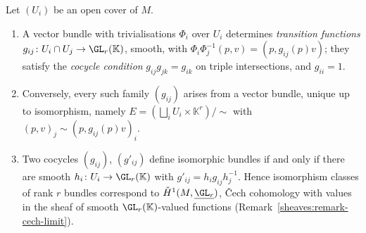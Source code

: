 \begin{proposition}\label{vector-bundles:proposition-cocycles}
Let $(U_i)$ be an open cover of $M$.
\begin{enumerate}
\item A vector bundle with trivialisations $\Phi_i$ over $U_i$ determines \emph{transition functions} $g_{ij} \colon U_i \cap U_j \to \GL_r(\mathbb{K})$, smooth, with
$\Phi_i\Phi_j^{-1}(p, v) = (p, g_{ij}(p)v)$; they satisfy the \emph{cocycle condition} $g_{ij}g_{jk} = g_{ik}$ on triple intersections, and $g_{ii} = 1$.
\item Conversely, every such family $(g_{ij})$ arises from a vector bundle, unique up to isomorphism, namely $E = (\bigsqcup_i U_i \times \mathbb{K}^r)/\sim$ with $(p, v)_j \sim (p, g_{ij}(p)v)_i$.
\item Two cocycles $(g_{ij})$, $(g'_{ij})$ define isomorphic bundles if and only if there are smooth $h_i \colon U_i \to \GL_r(\mathbb{K})$ with $g'_{ij} = h_ig_{ij}h_j^{-1}$. Hence isomorphism classes of rank
$r$ bundles correspond to $\check{H}^1(M, \underline{\GL_r})$, \v{C}ech cohomology with values in the sheaf of smooth $\GL_r(\mathbb{K})$-valued functions
(Remark~\ref{sheaves:remark-cech-limit}).
\end{enumerate}
\end{proposition}


